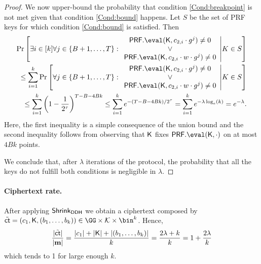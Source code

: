 \begin{proof}
We now upper-bound the probability that condition \ref{Cond:breakpoint} is not met given that condition \ref{Cond:bound} happens. Let $S$ be the set of PRF keys for which condition \ref{Cond:bound} is satisfied. Then
\begin{align*}
    \Pr\left[\exists i\in[k] \forall j\in\{B+1,\dots ,T\}:\begin{array}{c}
     \PRF.\eval(\key,c_{2,i}\cdot g^j)\neq 0   \\
     \lor \\
     \PRF.\eval(\key,c_{2,i}\cdot w\cdot g^j)\neq 0 
\end{array}\middle| K\in S \right]\\
\leq \sum_{i=1}^k \Pr\left[\forall j\in\{B+1,\dots ,T\}:\begin{array}{c}
     \PRF.\eval(\key,c_{2,i}\cdot g^j)\neq 0   \\
     \lor \\
     \PRF.\eval(\key,c_{2,i}\cdot w\cdot g^j)\neq 0 
\end{array}\middle| K\in S \right] \\ 
\leq \sum_{i=1}^k\left(1-\frac{1}{2^\tau}\right)^{T-B-4Bk}\leq \sum_{i=1}^k e^{-(T-B-4Bk)/2^\tau}=  \sum_{i=1}^k e^{-\lambda\log_e(k)}=e^{-\lambda}.
\end{align*}
Here, the first inequality is a simple consequence of the union bound and the second inequality follows from observing that $\mathsf{K}$ fixes $\PRF.\eval(\key,\cdot)$ on at most $4Bk$ points.

We conclude that, after $\lambda$ iterations of the protocol, the probability that all the keys do not fulfill both conditions is negligible in $\lambda$.
\end{proof}

\paragraph{Ciphertext rate.} After applying $\mathsf{Shrink}_\mathsf{DDH}$ we obtain a ciphertext composed by $\tilde \ct=(c_1,\key,(b_1,\dots, b_k))\in\GG\times \Kc\times \bin^k$. Hence, $$\frac{|\tilde {\mathsf{ct}}|}{|\mathbf{m}|}=\frac{|c_1|+|\mathsf{K}|+|(b_1,\dots, b_k)|}{k}=\frac{2\lambda + k}{k}=1+\frac{2\lambda}{k}$$ which tends to 1 for large enough $k$.



